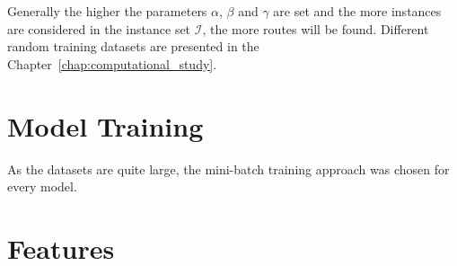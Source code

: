 Generally the higher the parameters $\alpha$, $\beta$ and $\gamma$ are set and the more instances
are considered in the instance set $\mathcal{I}$, the more routes will be found. Different
random training datasets are presented in the Chapter~\ref{chap:computational_study}.

\section{Model Training}
\label{sec:ModelTraining}

As the datasets are quite large, the mini-batch training approach was chosen for every model.

\section{Features}
\label{sec:Features}
